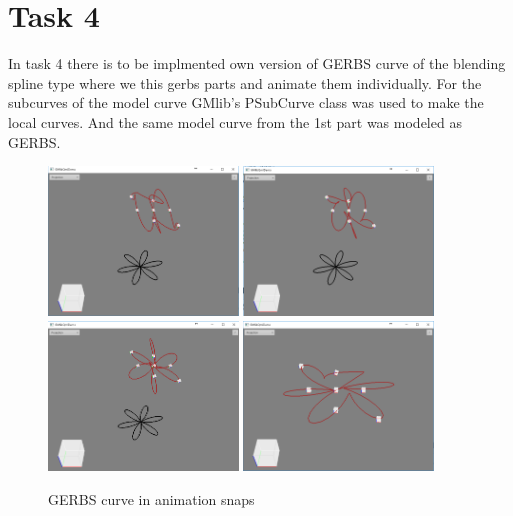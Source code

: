 \documentclass[a4,10pt]{article}
\begin{document}
\section{Task 4}
In task 4 there is to be implmented own version of GERBS curve of the blending spline type where we this gerbs parts and animate them individually. For the subcurves of the model curve
GMlib's PSubCurve class was used to make the local curves. And the same model curve from the 1st part was modeled as GERBS.

\begin{figure}[H]
	\centering
	\includegraphics[width=0.45\textwidth]{gfx/gerbcurve1.png}
	\includegraphics[width=0.45\textwidth]{gfx/gerbcurve2.png}
	\includegraphics[width=0.45\textwidth]{gfx/gerbcurve3.png}
	\includegraphics[width=0.45\textwidth]{gfx/gerbcurve4.png}
	\caption{GERBS curve in animation snaps}
	\label{fig:gcurve}
\end{figure}
\end{document}
